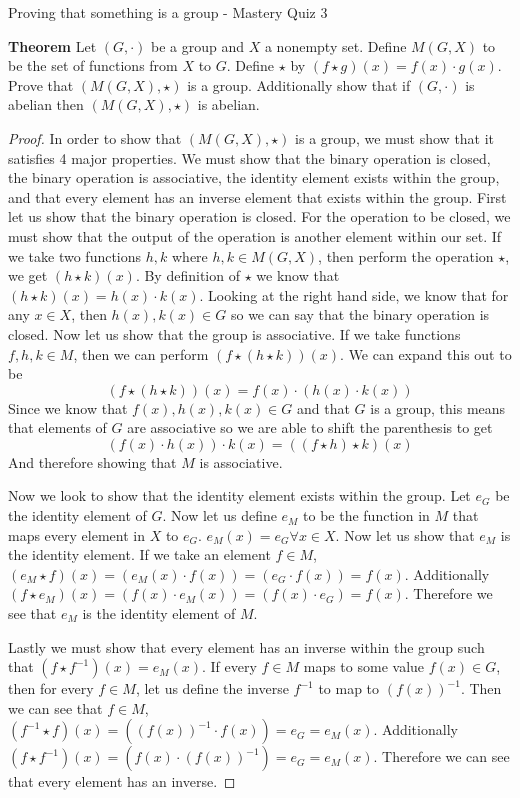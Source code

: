Proving that something is a group - Mastery Quiz 3

\textbf{Theorem}
Let $(G,·)$ be a group and $X$ a nonempty set.  Define $M(G, X)$ to be the set of functions from $X$ to $G$.  Define $\star$ by $(f \star g)(x) =f(x)\cdot g(x)$.  Prove that $(M(G, X), \star)$ is a group.  Additionally show that if $(G,·)$ is abelian then $(M(G, X), \star)$ is abelian.

\begin{proof}
In order to show that $(M(G, X), \star)$ is a group, we must show that it satisfies 4 major properties. We must show that the binary operation is closed, the binary operation is associative, the identity element exists within the group, and that every element has an inverse element that exists within the group.
First let us show that the binary operation is closed. For the operation to be closed, we must show that the output of the operation is another element within our set. If we take two functions $h,k$ where $h,k \in M(G, X)$, then perform the operation $\star$, we get $(h \star k)(x)$. By definition of $\star$ we know that $(h \star k)(x) = h(x) \cdot k(x)$. Looking at the right hand side, we know that for any $x\in X$, then $h(x),k(x) \in G$ so we can say that the binary operation is closed. Now let us show that the group is associative. If we take functions $f,h,k\in M$, then we can perform $(f\star (h \star k))(x)$. We can expand this out to be 
$$(f\star (h \star k))(x) = f(x) \cdot (h(x) \cdot k(x))$$
Since we know that $f(x),h(x),k(x) \in G$ and that $G$ is a group, this means that elements of $G$ are associative so we are able to shift the parenthesis to get 
$$ (f(x) \cdot h(x)) \cdot k(x) = ((f\star h) \star k)(x) $$
And therefore showing that $M$ is associative.

Now we look to show that the identity element exists within the group. Let $e_G$ be the identity element of $G$. Now let us define $e_M$ to be the function in $M$ that maps every element in $X$ to $e_G$. $e_M(x) = e_G \forall x\in X$. Now let us show that $e_M$ is the identity element. If we take an element $f\in M$, $(e_M \star f) (x) = (e_M(x) \cdot f(x)) = (e_G \cdot f(x)) = f(x)$. Additionally  $(f \star e_M) (x) = (f(x) \cdot e_M(x)) =  (f(x)\cdot e_G ) = f(x)$. Therefore we see that $e_M$ is the identity element of $M$.

Lastly we must show that every element has an inverse within the group such that $(f \star f^{-1}) (x) = e_M(x)$. If every $f\in M$ maps to some value $f(x) \in G$, then for every $f\in M$, let us define the inverse $f^{-1}$ to map to $(f(x))^{-1}$. Then we can see that $f\in M$, $(f^{-1} \star f) (x) = ((f(x))^{-1} \cdot f(x)) = e_G = e_M(x)$. Additionally  $(f \star f^{-1}) (x) = (f(x) \cdot (f(x))^{-1}) = e_G = e_M(x)$. Therefore we can see that every element has an inverse.


\end{proof}
